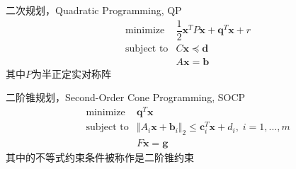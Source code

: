 \documentclass[10pt]{beamer}
\begin{document}

\begin{frame}

\begin{block}{二次规划，Quadratic Programming, QP}
\begin{eqnarray*}
& \text{minimize} & \dfrac{1}{2}\mathbf{x}^T P  \mathbf{x} + \mathbf{q}^T \mathbf{x} + r \\
& \text{subject to} & C \mathbf{x} \preccurlyeq \mathbf{d} \\
& & A\mathbf{x} = \mathbf{b}
\end{eqnarray*}
其中$P$为半正定实对称阵
\end{block}

\end{frame}


\begin{frame}

\begin{block}{二阶锥规划，Second-Order Cone Programming, SOCP}
\begin{eqnarray*}
& \text{minimize} & \mathbf{q}^T \mathbf{x} \\
& \text{subject to} & \Vert A_i\mathbf{x} + \mathbf{b}_i \Vert_2 \le \mathbf{c}_i^T \mathbf{x} + d_i, \; i = 1,\ldots,m \\
& & F\mathbf{x} = \mathbf{g}
\end{eqnarray*}
其中的不等式约束条件被称作是二阶锥约束
\end{block}

\end{frame}



\end{document}
